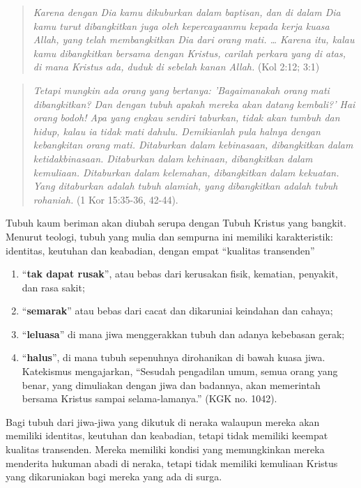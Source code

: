 \begin{quote}
\textit{Karena dengan Dia kamu dikuburkan dalam baptisan, dan di dalam Dia kamu turut dibangkitkan juga oleh kepercayaanmu kepada kerja kuasa Allah, yang telah membangkitkan Dia dari orang mati. \ldots
Karena itu, kalau kamu dibangkitkan bersama dengan Kristus, carilah perkara yang di atas, di mana Kristus ada, duduk di sebelah kanan Allah.
}(Kol 2:12; 3:1)
\end{quote}   


\begin{quote}
\textit{Tetapi mungkin ada orang yang bertanya: 'Bagaimanakah orang mati dibangkitkan? Dan dengan tubuh apakah mereka akan datang kembali?' Hai orang bodoh! Apa yang engkau sendiri taburkan, tidak akan tumbuh dan hidup, kalau ia tidak mati dahulu. Demikianlah pula halnya dengan kebangkitan orang mati. Ditaburkan dalam kebinasaan, dibangkitkan dalam ketidakbinasaan. Ditaburkan dalam kehinaan, dibangkitkan dalam kemuliaan. Ditaburkan dalam kelemahan, dibangkitkan dalam kekuatan. Yang ditaburkan adalah tubuh alamiah, yang dibangkitkan adalah tubuh rohaniah.} (1 Kor 15:35-36, 42-44).
\end{quote}

Tubuh kaum beriman akan diubah serupa dengan Tubuh Kristus yang bangkit. Menurut teologi, tubuh yang mulia dan sempurna ini memiliki karakteristik: identitas, keutuhan dan keabadian, dengan empat ``kualitas transenden''
\begin{enumerate} 
\item ``\textbf{tak dapat rusak}'', atau bebas dari kerusakan fisik, kematian, penyakit, dan rasa sakit; 
\item ``\textbf{semarak}'' atau bebas dari cacat dan dikaruniai keindahan dan cahaya; 
\item ``\textbf{leluasa}'' di mana jiwa menggerakkan tubuh dan adanya kebebasan gerak; 
\item ``\textbf{halus}'', di mana tubuh sepenuhnya dirohanikan di bawah kuasa jiwa. Katekismus mengajarkan, ``Sesudah pengadilan umum, semua orang yang benar, yang dimuliakan dengan jiwa dan badannya, akan memerintah bersama Kristus sampai selama-lamanya.'' (KGK no. 1042).
\end{enumerate}

Bagi tubuh dari jiwa-jiwa yang dikutuk di neraka
walaupun mereka akan memiliki identitas, keutuhan dan keabadian, tetapi tidak memiliki keempat kualitas transenden. Mereka memiliki kondisi yang memungkinkan mereka menderita hukuman abadi di neraka, tetapi tidak memiliki kemuliaan Kristus yang dikaruniakan bagi mereka yang ada di surga.

